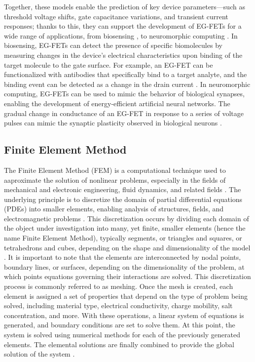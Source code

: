Together, these models enable the prediction of key device parameters—such as threshold voltage shifts, gate capacitance variations, and transient current responses; thanks to this, they can support the development of EG-FETs for a wide range of applications, from biosensing \citep{piccaUltimately2020,chennitInkjetPrinted2023}, to neuromorphic computing \citep{masseyModeling2021}.
In biosensing, EG-FETs can detect the presence of specific biomolecules by measuring changes in the device's electrical characteristics upon binding of the target molecule to the gate surface. For example, an EG-FET can be functionalized with antibodies that specifically bind to a target analyte, and the binding event can be detected as a change in the drain current \citep{piccaUltimately2020}. In neuromorphic computing, EG-FETs can be used to mimic the behavior of biological synapses, enabling the development of energy-efficient artificial neural networks. The gradual change in conductance of an EG-FET in response to a series of voltage pulses can mimic the synaptic plasticity observed in biological neurons \citep{masseyModeling2021}.

\subsection{Finite Element Method}
\label{sec:FEM}
The Finite Element Method (FEM) is a computational technique used to aaproximate the solution of nonlinear problems, especially in the fields of mechanical and electronic engineering, fluid dynamics, and related fields \citep{zienkiewiczFinite2013}. The underlying principle is to discretize the domain of partial differential equations (PDEs) into smaller elements, enabling analysis of structures, fields, and electromagnetic problems \citep{loggAutomating2007}. This discretization occurs by dividing each domain of the object under investigation into many, yet finite, smaller elements (hence the name Finite Element Method), typically segments, or triangles and squares, or tetrahedrons and cubes, depending on the shape and dimensionality of the model \citep{comsolCOMSOL_manual}. It is important to note that the elements are interconnected by nodal points, boundary lines, or surfaces, depending on the dimensionality of the problem, at which points equations governing their interactions are solved. This discretization process is commonly referred to as meshing. Once the mesh is created, each element is assigned a set of properties that depend on the type of problem being solved, including material type, electrical conductivity, charge mobility, salt concentration, and more. With these operations, a linear system of equations is generated, and boundary conditions are set to solve them. At this point, the system is solved using numerical methods for each of the previously generated elements. The elemental solutions are finally combined to provide the global solution of the system \citep{zienkiewiczFinite2013}.

